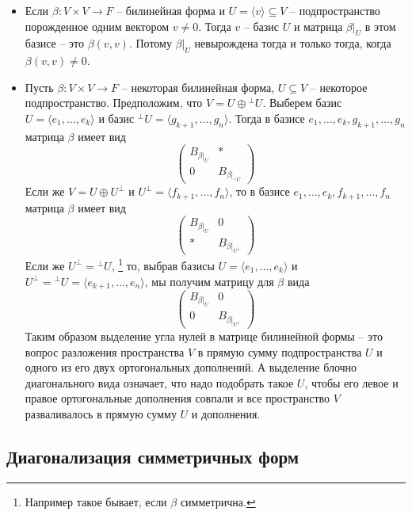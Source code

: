 \begin{itemize}
\item Если $\beta\colon V\times V\to F$ -- билинейная форма и $U =\langle v \rangle \subseteq V$ -- подпространство порожденное одним вектором $v\neq 0$.
Тогда $v$ -- базис $U$ и матрица $\beta|_U$ в этом базисе -- это $\beta(v, v)$.
Потому $\beta|_U$ невырождена тогда и только тогда, когда $\beta(v, v)\neq 0$.

\item Пусть $\beta\colon V\times V\to F$ -- некоторая билинейная форма, $U\subseteq V$ -- некоторое подпространство.
Предположим, что $V = U \oplus {}^\bot U$.
Выберем базис $U = \langle e_1,\ldots,e_k\rangle$ и базис ${}^\bot U = \langle g_{k+1},\ldots, g_n\rangle$.
Тогда в базисе $e_1,\ldots,e_k, g_{k+1}, \ldots, g_n$ матрица $\beta$ имеет вид
\[
\begin{pmatrix}
{B_{\beta|_U}}&{*}\\
{0}&{B_{\beta|_{{}^\bot U}}}
\end{pmatrix}
\]
Если же $V = U \oplus U^\bot$ и $U^\bot =\langle f_{k+1},\ldots, f_n\rangle$, то в базисе $e_1,\ldots,e_k,f_{k+1},\ldots, f_n$ матрица $\beta$ имеет вид
\[
\begin{pmatrix}
{B_{\beta|_U}}&{0}\\
{*}&{B_{\beta|_{U^\bot}}}
\end{pmatrix}
\]
Если же $U^\bot = {}^\bot U$,%
\footnote{Например такое бывает, если $\beta$ симметрична.}
то, выбрав базисы $U = \langle e_1,\ldots,e_k\rangle$ и $U^\bot = {}^\bot U = \langle e_{k+1}, \ldots, e_n\rangle$, мы получим матрицу для $\beta$ вида
\[
\begin{pmatrix}
{B_{\beta|_U}}&{0}\\
{0}&{B_{\beta|_{U^\bot}}}
\end{pmatrix}
\]
Таким образом выделение угла нулей в матрице билинейной формы -- это вопрос разложения пространства $V$ в прямую сумму подпространства $U$ и одного из его двух ортогональных дополнений.
А выделение блочно диагонального вида означает, что надо подобрать такое $U$, чтобы его левое и правое ортогональные дополнения совпали и все пространство $V$ разваливалось в прямую сумму $U$ и дополнения.
\end{itemize}

\subsection{Диагонализация симметричных форм}

